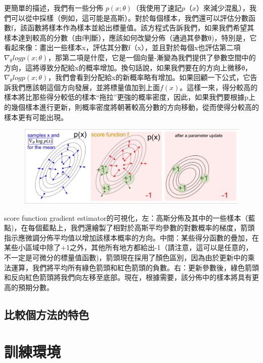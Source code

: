 \documentclass[14pt,a4paper]{report}  %
\begin{document}
更簡單的描述，我們有一些分佈 $p(x;\theta)$（我使用了速記$ p（x）$來減少混亂），我們可以從中採樣（例如，這可能是高斯）。對於每個樣本，我們還可以評估分數函數f，該函數將樣本作為樣本並給出標量值。該方程式告訴我們，如果我們希望其樣本達到較高的分數（由f判斷），應該如何改變分佈（通過其參數θ)，特別是，它看起來像：畫出一些樣本x，評估其分數f（x），並且對於每個x也評估第二項 $\nabla_\theta logp(x;θ)$，那第二項是什麼，它是一個向量-漸變為我們提供了參數空間中的方向，這將導致分配給x的概率增加。換句話說，如果我們要在的方向上微移θ，$\nabla_\theta logp(x;θ)$，我們會看到分配給x的新概率略有增加。如果回顧一下公式，它告訴我們應該朝這個方向發展，並將標量值加到上面$f(x)$。這樣一來，得分較高的樣本將比那些得分較低的樣本“拖拉”更強的概率密度，因此，如果我們要根據p上的幾個樣本進行更新，則概率密度將朝著較高分數的方向移動，從而使得分較高的樣本更有可能出現。\\
\begin{figure}[hbt!]
\begin{center}
\includegraphics[scale=0.4]{figure}
\end{center}
\end{figure}
\qquad score function gradient estimator的可視化，左：高斯分佈及其中的一些樣本（藍點)，在每個藍點上，我們還繪製了相對於高斯平均參數的對數概率的梯度，箭頭指示應微調分佈平均值以增加該樣本概率的方向。中間：某些得分函數的疊加，在某些小區域中除了+1之外，其他所有地方都給出-1（請注意，這可以是任意的，不一定是可微分的標量值函數)，箭頭現在採用了顏色區別，因為由於更新中的乘法運算，我們將平均所有綠色箭頭和紅色箭頭的負數。右：更新參數後，綠色箭頭和反向紅色箭頭將我們向左移至底部。現在，根據需要，該分佈中的樣本將具有更高的預期分數。\\
\newpage
\section{比較個方法的特色}
\newpage
\chapter{訓練環境}
\end{document}
